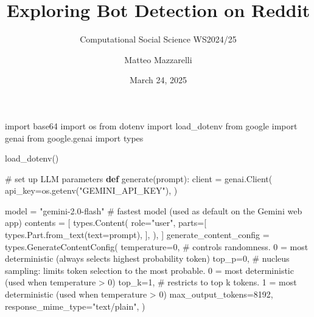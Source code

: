 \documentclass[
  12pt,
  letterpaper,
  DIV=11,
  numbers=noendperiod]{scrartcl}
\title{Exploring Bot Detection on Reddit}
\subtitle{Computational Social Science WS2024/25}
\author{Matteo Mazzarelli}
\date{March 24, 2025}
\newenvironment{Shaded}{\begin{snugshade}}{\end{snugshade}}
\newcommand{\CommentTok}[1]{\textcolor[rgb]{0.37,0.37,0.37}{#1}}
\newcommand{\DecValTok}[1]{\textcolor[rgb]{0.68,0.00,0.00}{#1}}
\newcommand{\ImportTok}[1]{\textcolor[rgb]{0.00,0.46,0.62}{#1}}
\newcommand{\KeywordTok}[1]{\textcolor[rgb]{0.00,0.23,0.31}{\textbf{#1}}}
\newcommand{\NormalTok}[1]{\textcolor[rgb]{0.00,0.23,0.31}{#1}}
\newcommand{\OperatorTok}[1]{\textcolor[rgb]{0.37,0.37,0.37}{#1}}
\newcommand{\StringTok}[1]{\textcolor[rgb]{0.13,0.47,0.30}{#1}}
\renewcommand*\contentsname{Table of contents}
\newcommand\contentsname{Table of contents}
\begin{document}
\maketitle

\renewcommand*\contentsname{Table of contents}
{
\hypersetup{linkcolor=}
\setcounter{tocdepth}{3}
\tableofcontents
}

\begin{Shaded}
\begin{Highlighting}[]
\ImportTok{import}\NormalTok{ base64}
\ImportTok{import}\NormalTok{ os}
\ImportTok{from}\NormalTok{ dotenv }\ImportTok{import}\NormalTok{ load\_dotenv }
\ImportTok{from}\NormalTok{ google }\ImportTok{import}\NormalTok{ genai}
\ImportTok{from}\NormalTok{ google.genai }\ImportTok{import}\NormalTok{ types}

\NormalTok{load\_dotenv()}

\CommentTok{\# set up LLM parameters}
\KeywordTok{def}\NormalTok{ generate(prompt):}
\NormalTok{    client }\OperatorTok{=}\NormalTok{ genai.Client(}
\NormalTok{        api\_key}\OperatorTok{=}\NormalTok{os.getenv(}\StringTok{"GEMINI\_API\_KEY"}\NormalTok{),}
\NormalTok{    )}

\NormalTok{    model }\OperatorTok{=} \StringTok{"gemini{-}2.0{-}flash"} \CommentTok{\# fastest model (used as default on the Gemini web app)}
\NormalTok{    contents }\OperatorTok{=}\NormalTok{ [}
\NormalTok{        types.Content(}
\NormalTok{            role}\OperatorTok{=}\StringTok{"user"}\NormalTok{,}
\NormalTok{            parts}\OperatorTok{=}\NormalTok{[}
\NormalTok{                types.Part.from\_text(text}\OperatorTok{=}\NormalTok{prompt),}
\NormalTok{            ],}
\NormalTok{        ),}
\NormalTok{    ]}
\NormalTok{    generate\_content\_config }\OperatorTok{=}\NormalTok{ types.GenerateContentConfig(}
\NormalTok{        temperature}\OperatorTok{=}\DecValTok{0}\NormalTok{, }\CommentTok{\# controls randomness. 0 = most deterministic (always selects highest probability token)}
\NormalTok{        top\_p}\OperatorTok{=}\DecValTok{0}\NormalTok{, }\CommentTok{\# nucleus sampling: limits token selection to the most probable. 0 = most deterministic (used when temperature \textgreater{} 0)}
\NormalTok{        top\_k}\OperatorTok{=}\DecValTok{1}\NormalTok{, }\CommentTok{\# restricts to top \textquotesingle{}k\textquotesingle{} tokens. 1 = most deterministic (used when temperature \textgreater{} 0)}
\NormalTok{        max\_output\_tokens}\OperatorTok{=}\DecValTok{8192}\NormalTok{,}
\NormalTok{        response\_mime\_type}\OperatorTok{=}\StringTok{"text/plain"}\NormalTok{,}
\NormalTok{    )}


\end{Highlighting}
\end{Shaded}
\end{document}
